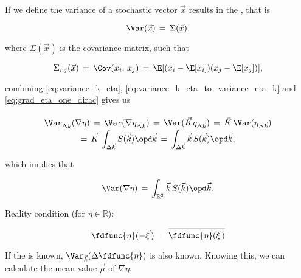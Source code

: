 {\HRule

If we define the variance of a stochastic vector $\vec{x}$ results in the , that is

\begin{equation}
\Var(\vec{x}) \,=\, \Sigma(\vec{x}),
\end{equation}

where $\Sigma(\vec{x})$ is the covariance matrix, such that

\begin{equation}
\Sigma_{i,j}(\vec{x}) \,=\, \Cov(x_i,\,x_j) \,=\, \E[(x_i - \E[x_i])(x_j - \E[x_j])],
\end{equation}

combining \eqref{eq:variance_k_eta}, \eqref{eq:variance_k_eta_to_variance_eta_k} and \eqref{eq:grad_eta_one_dirac} gives us

\begin{equation}
\renewcommand*{\arraystretch}{1.5}
\begin{array}{c}
\displaystyle \Var_{\Delta\vec{k}}(\nabla\eta) \,=\, \Var(\nabla\eta_{\Delta\vec{k}}) \,=\, \Var(\vec{K}\eta_{\Delta\vec{k}}) \,=\, \vec{K}\,\Var(\eta_{\Delta\vec{k}}) \\
\displaystyle =\, \vec{K}\,\int_{\Delta\vec{k}}S(\vec{k})\opd\vec{k} \,=\, \int_{\Delta\vec{k}}\vec{k}\,S(\vec{k})\opd\vec{k},
\end{array}
\end{equation}

which implies that 

\begin{equation}
\Var(\nabla\eta) \,=\, \int_{\mathbb{R}^2}\vec{k}\,S(\vec{k})\opd\vec{k}.
\end{equation}







\HRule

Reality condition (for $\eta\in\mathbb{R}$):

\begin{equation}
\fdfunc{\eta}(-\vec{\xi}\,) \,=\, \overline{\fdfunc{\eta}(\vec{\xi}\,)}
\end{equation}

\HRule

If the  is known, $\Var_{\vec{k}}(\Delta\fdfunc{\eta})$ is also known. Knowing this, we can calculate the mean value $\vec{\mu}$ of $\nabla\eta$,

}
